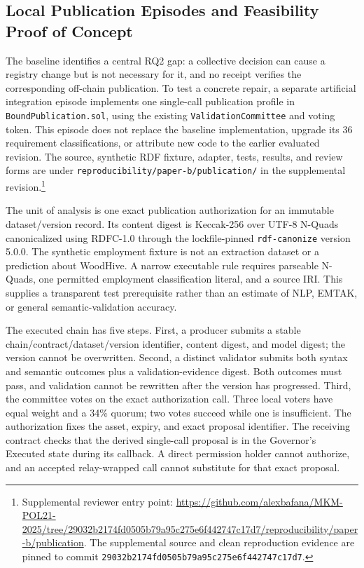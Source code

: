 \documentclass[journal]{IEEEtran}
\begin{document}
\subsection{Local Publication Episodes and Feasibility Proof of Concept}
\label{sec:publication_episode}

The baseline identifies a central RQ2 gap: a collective decision can cause a
registry change but is not necessary for it, and no receipt verifies the
corresponding off-chain publication. To test a concrete repair, a separate
artificial integration episode implements one single-call publication profile
in \texttt{BoundPublication.sol}, using the existing
\texttt{ValidationCommittee} and voting token. This episode does not replace
the baseline implementation, upgrade its 36 requirement classifications, or
attribute new code to the earlier evaluated revision. The source, synthetic
RDF fixture, adapter, tests, results, and review forms are under
\texttt{reproducibility/paper-b/publication/} in the supplemental revision.\footnote{Supplemental reviewer entry point:
\url{https://github.com/alexbafana/MKM-POL21-2025/tree/29032b2174fd0505b79a95c275e6f442747c17d7/reproducibility/paper-b/publication}. The supplemental source and clean reproduction evidence are pinned to commit \texttt{29032b2174fd0505b79a95c275e6f442747c17d7}.}

The unit of analysis is one exact publication authorization for an immutable
dataset/version record. Its content digest is Keccak-256 over UTF-8 N-Quads
canonicalized using RDFC-1.0 through the lockfile-pinned
\texttt{rdf-canonize} version 5.0.0. The synthetic employment fixture is not an
extraction dataset or a prediction about WoodHive. A narrow executable rule
requires parseable N-Quads, one permitted employment classification literal,
and a source IRI. This supplies a transparent test prerequisite rather than
an estimate of NLP, EMTAK, or general semantic-validation accuracy.

The executed chain has five steps. First, a producer submits a stable
chain/contract/dataset/version identifier, content digest, and model digest;
the version cannot be overwritten. Second, a distinct validator submits both
syntax and semantic outcomes plus a validation-evidence digest. Both outcomes
must pass, and validation cannot be rewritten after the version has progressed.
Third, the committee votes on the exact authorization call. Three local voters
have equal weight and a 34\% quorum; two votes succeed while one is insufficient.
The authorization fixes the asset, expiry, and exact proposal identifier.
The receiving contract checks that the derived single-call proposal is in the
Governor's Executed state during its callback. A direct permission holder
cannot authorize, and an accepted relay-wrapped call cannot substitute for that
exact proposal.
\end{document}
